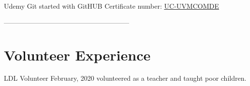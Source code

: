 \documentclass[]{cv-style}          %
\begin{document}
\begin{entrylist}
\entry
{Udemy}
{Git started with GitHUB}
{}
{Certificate number: \href{https://www.udemy.com/certificate/UC-UVMCOMDE/}{\underline{UC-UVMCOMDE}}}


\end{entrylist} 



--------------------------------------------------------

\section{Volunteer Experience}
  \vspace{-0.3cm}
\begin{entrylist}
\entry
{LDL}
{Volunteer}
{February, 2020}
{volunteered as a teacher and taught poor children.}
\end{entrylist}\
\end{document}
